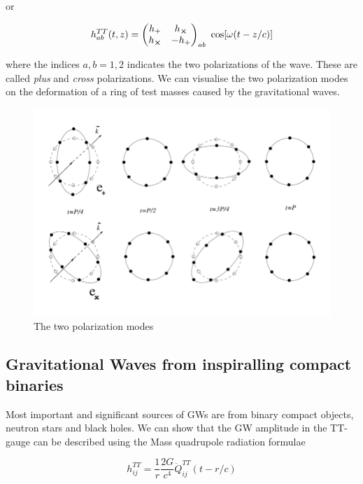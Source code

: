 \documentclass[12pt,a4paper,oneside]{book}
\begin{document}
or

\begin{equation}
\label{eq:Wave-eq-sol-pol}
h^{TT}_{ab}(t,z) = \begin{pmatrix}
h_{+} & h_{\cross} \\
h_{\cross} & -h_{+}  \\
\end{pmatrix}_{ab} \ \cos[\omega (t - z/c)]
\end{equation}

where the indices $a,b = 1,2$ indicates the two  polarizations of the wave. These are called \emph{plus} and \emph{cross} polarizations. We can visualise the two polarization modes on the deformation of a ring of test masses caused by the gravitational waves.


\begin{figure}[!hb]
\centering
\includegraphics[scale=0.45]{../Figures/Schematic-deformations-produced-on-a-ring-of-freely-falling-particles-by-gravitational.png}
\caption{The two polarization modes}
\label{fig:polarization-viz}
\end{figure}
 

\subsection*{Gravitational Waves from inspiralling compact binaries}

Most important and significant sources of GWs are from binary compact objects, neutron stars and black holes. We can show that the GW amplitude in the TT-gauge can be described using the Mass quadrupole radiation formulae

\begin{equation}
\label{eq: Quadrupole formula}
h^{TT}_{ij} = \frac{1}{r} \frac{2 G}{c^4} \ddot{Q}_{ij}^{TT}(t-r/c)
\end{equation}
\end{document}
